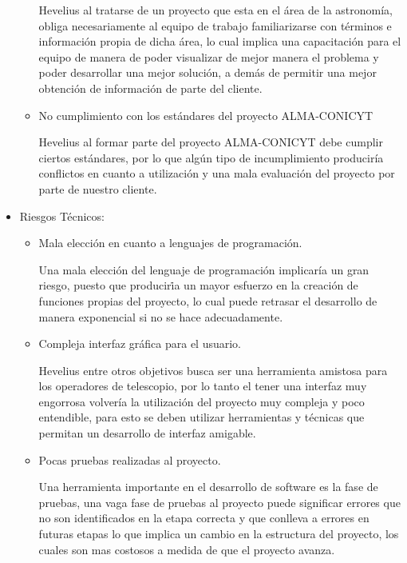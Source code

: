 \documentclass[letterpaper,spanish,10pt]{article}
\begin{document}
\begin{itemize}
\begin{itemize}
Hevelius al tratarse de un proyecto que esta en el \'area de la astronom\'ia, obliga necesariamente al equipo de trabajo familiarizarse con t\'erminos e informaci\'on propia de dicha \'area, lo cual implica una capacitaci\'on para el equipo de manera de poder visualizar de mejor manera el problema y poder desarrollar una mejor soluci\'on, a dem\'as de permitir una mejor obtenci\'on de informaci\'on de parte del cliente. 

\item{No cumplimiento con los est\'andares del proyecto ALMA-CONICYT}

Hevelius al formar parte del proyecto ALMA-CONICYT debe cumplir ciertos est\'andares, por lo que alg\'un tipo de incumplimiento producir\'ia conflictos en cuanto a utilizaci\'on y una mala evaluaci\'on del proyecto por parte de nuestro cliente.

\end{itemize}


\item{Riesgos T\'ecnicos:}
\begin{itemize}
\item{Mala elecci\'on en cuanto a lenguajes de programaci\'on.}

Una mala elecci\'on del lenguaje de programaci\'on implicar\'ia un gran riesgo, puesto que producir\.ia un mayor esfuerzo en la creaci\'on de funciones propias del proyecto, lo cual puede retrasar el desarrollo de manera exponencial si no se hace adecuadamente.

\item{Compleja interfaz gr\'afica para el usuario.}

Hevelius entre otros objetivos busca ser una herramienta amistosa para los operadores de telescopio, por lo tanto el tener una interfaz muy engorrosa volver\'ia la utilizaci\'on del proyecto muy compleja y poco entendible, para esto se deben utilizar herramientas y t\'ecnicas que permitan un desarrollo de interfaz amigable.

\item{Pocas pruebas realizadas al proyecto.}

Una herramienta importante en el desarrollo de software es la fase de pruebas, una vaga fase de pruebas al proyecto puede significar errores que no son identificados en la etapa correcta y que conlleva a errores en futuras etapas lo que implica un cambio en la estructura del proyecto, los cuales son mas costosos a medida de que el proyecto avanza.
\end{itemize}
\end{itemize}
\end{document}
